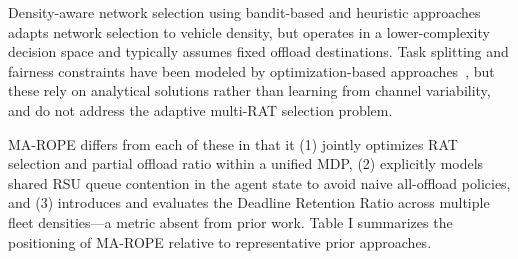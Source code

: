 Density-aware network selection using bandit-based and heuristic approaches~\cite{haq2026} adapts network selection to vehicle density, but operates in a lower-complexity decision space and typically assumes fixed offload destinations. Task splitting and fairness constraints have been modeled by optimization-based approaches~\cite{mach2017}, but these rely on analytical solutions rather than learning from channel variability, and do not address the adaptive multi-RAT selection problem.

MA-ROPE differs from each of these in that it (1) jointly optimizes RAT selection and partial offload ratio within a unified MDP, (2) explicitly models shared RSU queue contention in the agent state to avoid naive all-offload policies, and (3) introduces and evaluates the Deadline Retention Ratio across multiple fleet densities—a metric absent from prior work. Table I summarizes the positioning of MA-ROPE relative to representative prior approaches.



